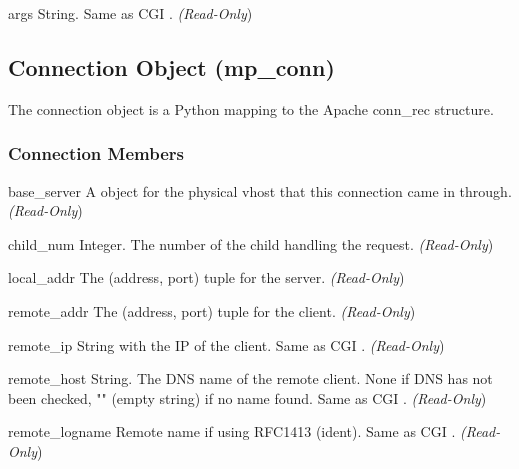 \begin{memberdesc}[Request]{args}
String. Same as CGI .
\emph{(Read-Only})
\end{memberdesc}

\subsection{Connection Object (mp_conn)\label{pyapi-mpconn}}

The connection object is a Python mapping to the Apache conn_rec
structure.

\subsubsection{Connection Members\label{pyapi-mpconn-mem}}

\begin{memberdesc}[connection]{base_server}
A  object for the physical vhost that this connection came in
through.
\emph{(Read-Only})
\end{memberdesc}

\begin{memberdesc}[connection]{child_num}
Integer. The number of the child handling the request.
\emph{(Read-Only})
\end{memberdesc}

\begin{memberdesc}[connection]{local_addr}
The (address, port) tuple for the server.
\emph{(Read-Only})
\end{memberdesc}

\begin{memberdesc}[connection]{remote_addr}
The (address, port) tuple for the client.
\emph{(Read-Only})
\end{memberdesc}

\begin{memberdesc}[connection]{remote_ip}
String with the IP of the client. Same as CGI .
\emph{(Read-Only})
\end{memberdesc}

\begin{memberdesc}[connection]{remote_host}
String. The DNS name of the remote client. None if DNS has not been
checked, "" (empty string) if no name found. Same as CGI .
\emph{(Read-Only})
\end{memberdesc}

\begin{memberdesc}[connection]{remote_logname}
Remote name if using RFC1413 (ident). Same as CGI .
\emph{(Read-Only})
\end{memberdesc}

